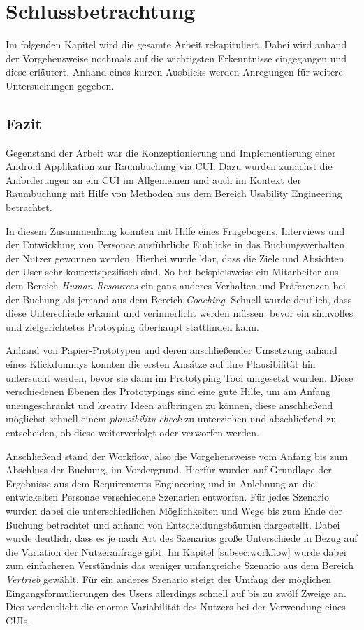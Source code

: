\chapter{Schlussbetrachtung}
\label{cha:schlussbetrachtung}

Im folgenden Kapitel wird die gesamte Arbeit rekapituliert. Dabei wird anhand der Vorgehensweise nochmals auf die wichtigsten Erkenntnisse eingegangen und diese erläutert. Anhand eines kurzen Ausblicks werden Anregungen für weitere Untersuchungen gegeben.

\section{Fazit}
\label{sec:fazit}

Gegenstand der Arbeit war die Konzeptionierung und Implementierung einer Android Applikation zur Raumbuchung via \acl{CUI}. Dazu wurden zunächst die Anforderungen an ein \ac{CUI} im Allgemeinen und auch im Kontext der Raumbuchung mit Hilfe von Methoden aus dem Bereich Usability Engineering betrachtet. 

In diesem Zusammenhang konnten mit Hilfe eines Fragebogens, Interviews und der Entwicklung von Personae ausführliche Einblicke in das Buchungsverhalten der Nutzer gewonnen werden. Hierbei wurde klar, dass die Ziele und Absichten der User sehr kontextspezifisch sind. So hat beispielsweise ein Mitarbeiter aus dem Bereich \textit{Human Resources} ein ganz anderes Verhalten und Präferenzen bei der Buchung als jemand aus dem Bereich \textit{Coaching}. Schnell wurde deutlich, dass diese Unterschiede erkannt und verinnerlicht werden müssen, bevor ein sinnvolles und zielgerichtetes Protoyping überhaupt stattfinden kann. 

Anhand von Papier-Prototypen und deren anschließender Umsetzung anhand eines Klickdummys konnten die ersten Ansätze auf ihre Plausibilität hin untersucht werden, bevor sie dann im Prototyping Tool umgesetzt wurden. Diese verschiedenen Ebenen des Prototypings sind eine gute Hilfe, um am Anfang uneingeschränkt und kreativ Ideen aufbringen zu können, diese anschließend möglichst schnell einem \textit{plausibility check} zu unterziehen und abschließend zu entscheiden, ob diese weiterverfolgt oder verworfen werden. 

Anschließend stand der Workflow, also die Vorgehensweise vom Anfang bis zum Abschluss der Buchung, im Vordergrund. Hierfür wurden auf Grundlage der Ergebnisse aus dem Requirements Engineering und in Anlehnung an die entwickelten Personae verschiedene Szenarien entworfen. Für jedes Szenario wurden dabei die unterschiedlichen Möglichkeiten und Wege bis zum Ende der Buchung betrachtet und anhand von Entscheidungsbäumen dargestellt. Dabei wurde deutlich, dass es je nach Art des Szenarios große Unterschiede in Bezug auf die Variation der Nutzeranfrage gibt. Im Kapitel \ref{subsec:workflow} wurde dabei zum einfacheren Verständnis das weniger umfangreiche Szenario aus dem Bereich \textit{Vertrieb} gewählt. Für ein anderes Szenario steigt der Umfang der möglichen Eingangsformulierungen des Users allerdings schnell auf bis zu zwölf Zweige an. Dies verdeutlicht die enorme Variabilität des Nutzers bei der Verwendung eines \aclp{CUI}.

